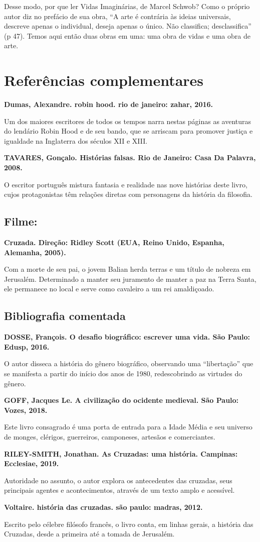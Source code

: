\documentclass[12pt]{extarticle}
\begin{document}
Desse modo, por que ler Vidas Imaginárias, de Marcel Schwob? Como o
próprio autor diz no prefácio de sua obra, ``A arte é contrária às
ideias universais, descreve apenas o individual, deseja apenas o único.
Não classifica; desclassifica'' (p 47). Temos aqui então duas obras em
uma: uma obra de vidas e uma obra de arte.


\section{Referências complementares}

\textbf{Dumas, Alexandre. robin hood. rio de janeiro: zahar, 2016.}

Um dos maiores escritores de todos os tempos narra nestas páginas as
aventuras do lendário Robin Hood e de seu bando, que se arriscam para
promover justiça e igualdade na Inglaterra dos séculos XII e XIII.

\textbf{TAVARES, Gonçalo. Histórias falsas. Rio de Janeiro: Casa Da
Palavra, 2008.}

O escritor português mistura fantasia e realidade nas nove histórias
deste livro, cujos protagonistas têm relações diretas com personagens da
história da filosofia.

\subsection{Filme: }

\textbf{Cruzada. Direção: Ridley Scott (EUA, Reino Unido, Espanha,
Alemanha, 2005).}

Com a morte de seu pai, o jovem Balian herda terras e um título de
nobreza em Jerusalém. Determinado a manter seu juramento de manter a paz
na Terra Santa, ele permanece no local e serve como cavaleiro a um rei
amaldiçoado.

\subsection{Bibliografia comentada}

\textbf{DOSSE, François. O desafio biográfico: escrever uma vida. São
Paulo: Edusp, 2016.}

O autor disseca a história do gênero biográfico, observando uma
``libertação'' que se manifesta a partir do início dos anos de 1980,
redescobrindo as virtudes do gênero.

\textbf{GOFF, Jacques Le. A civilização do ocidente medieval. São Paulo:
Vozes, 2018.}

Este livro consagrado é uma porta de entrada para a Idade Média e seu
universo de monges, clérigos, guerreiros, camponeses, artesãos e
comerciantes.

\textbf{RILEY-SMITH, Jonathan. As Cruzadas: uma história. Campinas:
Ecclesiae, 2019.}

Autoridade no assunto, o autor explora os antecedentes das cruzadas,
seus principais agentes e acontecimentos, através de um texto amplo e
acessível.

\textbf{Voltaire. história das cruzadas. são paulo: madras, 2012.}

Escrito pelo célebre filósofo francês, o livro conta, em linhas gerais,
a história das Cruzadas, desde a primeira até a tomada de Jerusalém.
\end{document}
